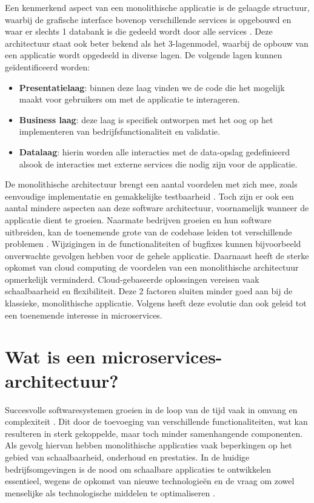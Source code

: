 Een kenmerkend aspect van een monolithische applicatie is de gelaagde structuur, waarbij de grafische interface bovenop verschillende services is opgebouwd en waar er slechts 1 databank is die gedeeld wordt door alle services \autocite{Velepucha2023}. Deze architectuur staat ook beter bekend als het 3-lagenmodel, waarbij de opbouw van een applicatie wordt opgedeeld in diverse lagen. De volgende lagen kunnen geïdentificeerd worden:

\begin{itemize}
	\item \textbf{Presentatielaag}: binnen deze laag vinden we de code die het mogelijk maakt voor gebruikers om met de applicatie te interageren.
	\item \textbf{Business laag}: deze laag is specifiek ontworpen met het oog op het implementeren van bedrijfsfunctionaliteit en validatie.
	\item \textbf{Datalaag}: hierin worden alle interacties met de data-opslag gedefinieerd alsook de interacties met externe services die nodig zijn voor de applicatie.
\end{itemize}

De monolithische architectuur brengt een aantal voordelen met zich mee, zoals eenvoudige implementatie en gemakkelijke testbaarheid \autocite{Li2022}. Toch zijn er ook een aantal mindere aspecten aan deze software architectuur, voornamelijk wanneer de applicatie dient te groeien. Naarmate bedrijven groeien en hun software uitbreiden, kan de toenemende grote van de codebase leiden tot verschillende problemen \autocite{Wei2025}. Wijzigingen in de functionaliteiten of bugfixes kunnen bijvoorbeeld onverwachte gevolgen hebben voor de gehele applicatie. Daarnaast heeft de sterke opkomst van cloud computing de voordelen van een monolithische architectuur opmerkelijk verminderd. Cloud-gebaseerde oplossingen vereisen vaak schaalbaarheid en flexibiliteit. Deze 2 factoren sluiten minder goed aan bij de klassieke, monolithische applicatie. Volgens \textcite{Wei2025} heeft deze evolutie dan ook geleid tot een toenemende interesse in microservices.

\section{Wat is een microservices-architectuur?}

Succesvolle softwaresystemen groeien in de loop van de tijd vaak in omvang en complexiteit \autocite{Abgaz2023}. Dit door de toevoeging van verschillende functionaliteiten, wat kan resulteren in sterk gekoppelde, maar toch minder samenhangende componenten. Als gevolg hiervan hebben monolithische applicaties vaak beperkingen op het gebied van schaalbaarheid, onderhoud en prestaties. In de huidige bedrijfsomgevingen is de nood om schaalbare applicaties te ontwikkelen essentieel, wegens de opkomst van nieuwe technologieën en de vraag om zowel menselijke als technologische middelen te optimaliseren \autocite{Nayim2023}.\newline

